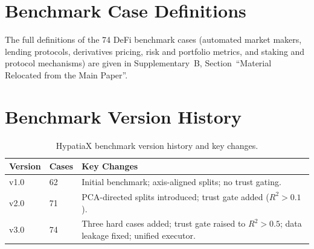 \documentclass[twoside,11pt]{article}
\newcommand{\Rsq}{R^{2}}
\begin{document}



\appendix

\section{Benchmark Case Definitions}\label{sec:benchmark_cases}
\label{app:cases}

The full definitions of the 74 DeFi benchmark cases (automated market makers, lending protocols, derivatives pricing, risk and portfolio metrics, and staking and protocol mechanisms) are given in Supplementary~B, Section~``Material Relocated from the Main Paper''.

\section{Benchmark Version History}\label{sec:version_history}
\label{app:versions}

\begin{table}[h]
\centering
\caption{HypatiaX benchmark version history and key changes.}
\begin{tabular}{llp{8cm}}
\toprule
Version & Cases & Key Changes \\
\midrule
v1.0 & 62 & Initial benchmark; axis-aligned splits; no trust gating. \\
v2.0 & 71 & PCA-directed splits introduced; trust gate added ($\Rsq > 0.1$). \\
v3.0 & 74 & Three hard cases added; trust gate raised to $\Rsq > 0.5$; data leakage fixed; unified executor. \\
\bottomrule
\end{tabular}
\end{table}
\end{document}
